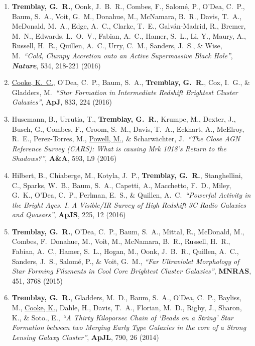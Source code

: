 \documentclass[11pt]{article}
\begin{document}
\begin{enumerate}
\item \textbf{Tremblay, G.~R.}, Oonk, J.~B.~R., Combes, F., Salom\'{e}, P., O'Dea, C.~P., Baum, S.~A., Voit, G.~M., Donahue, M., McNamara, B.~R., Davis, T.~A., McDonald, M.~A., Edge, A.~C., Clarke, T.~E., Galv\'{a}n-Madrid, R., Bremer, M.~N., Edwards, L.~O.~V., Fabian, A.~C.,  Hamer, S.~L., Li, Y., Maury, A., Russell, H.~R., Quillen, A.~C., Urry, C.~M., Sanders, J.~S., \& Wise, M.\ \textit{``Cold, Clumpy Accretion onto an Active Supermassive Black Hole''}, \textit{\textbf{Nature}},  534, 218-221 (2016)


\item \uline{Cooke, K.~C.}, O'Dea, C.~P., Baum, S.~A., \textbf{Tremblay, G.~R.}, Cox, I.~G., \& Gladders, M.\ \textit{``Star Formation in Intermediate Redshift Brightest Cluster Galaxies''}, \textbf{ApJ}, 833, 224 (2016)


\item Husemann, B., Urrutia, T., \textbf{Tremblay, G.~R.}, Krumpe, M., Dexter, J., Busch, G., Combes, F., Croom, S.~M., Davis, T.~A., Eckhart, A., McElroy, R.~E., Perez-Torres, M., \uline{Powell, M.}, \& Scharw\"{a}chter, J.\ \textit{``The Close AGN Reference Survey (CARS): What is causing Mrk 1018's Return to the Shadows?''}, \textbf{A\&A}, 593, L9 (2016)



\item Hilbert, B., Chiaberge, M., Kotyla, J.~P., \textbf{Tremblay, G.~R.}, Stanghellini, C., Sparks, W.~B., Baum, S.~A., Capetti, A., Macchetto, F.~D., Miley, G.~K., O'Dea, C.~P., Perlman, E.~S., \& Quillen, A.~C.\ \textit{``Powerful Activity in the Bright Ages. I. A Visible/IR Survey of High Redshift 3C Radio Galaxies and Quasars''}, \textbf{ApJS}, 225, 12  (2016)


\item \textbf{Tremblay, G.~R.}, O'Dea, C.~P., Baum, S.~A., Mittal, R., McDonald, M., Combes, F.~Donahue, M., Voit, M., McNamara, B.~R., Russell, H.~R., Fabian, A.~C., Hamer, S.~L., Hogan, M., Oonk, J.~B.~R., Quillen, A.~C., Sanders, J.~S., Salom\'{e}, P., \& Voit, G.~M., \textit{``Far Ultraviolet Morphology of Star Forming Filaments in Cool Core Brightest Cluster Galaxies''}, \textbf{MNRAS}, 451, 3768 (2015)

\item \textbf{Tremblay, G.~R.}, Gladders, M.~D., Baum, S.~A., O'Dea, C.~P., Bayliss, M., \uline{Cooke, K.}, Dahle, H., Davis, T.~A., Florian, M.~D., Rigby, J., Sharon, K., \& Soto., E.,   \textit{``A Thirty Kiloparsec Chain of `Beads on a String' Star Formation between two Merging Early Type Galaxies in the core of a Strong Lensing Galaxy Cluster''}, \textbf{ApJL}, 790, 26 (2014)



\end{enumerate}
\end{document}
